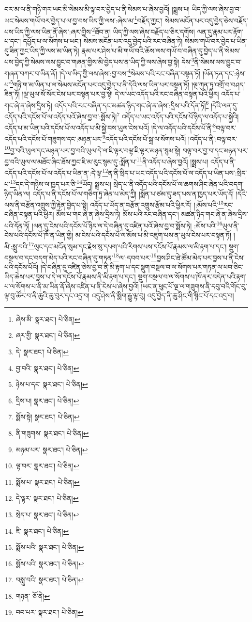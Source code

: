 བར་མ་ལ་ནི་གཉི་གར་ཡང་མི་སེམས་མི་ལྟ་བར་བྱེད་པ་ནི་སེམས་པ་ཞེས་བྱའོ། །སྨྲས་པ། ཡིད་ཀྱི་ལས་ཞེས་བྱ་བ་ཡང་སེམས་གཡོ་བར་བྱེད་པ་ལ་བྱ་བས་ཡིད་ཀྱི་ལས་:ཞེས་མ་\footnote{ཞེས་མི་  སྣར་ཐང་།  པེ་ཅིན། }བརྗོད་ཀྱང་། སེམས་མངོན་པར་འདུ་བྱེད་ཅེས་བརྗོད་པས་ཡིད་ཀྱི་ལས་ཡིན་ནོ་ཞེས་:ཞར་གྱིས་\footnote{ཞར་གྱི་  སྣར་ཐང་།  པེ་ཅིན། }ཐོབ་ན། ཡིད་ཀྱི་ལས་ཞེས་བརྗོད་པ་ཅིར་དགོས། ལན་དུ་རྣམ་པར་རྟོག་པ་དང་། དཔྱོད་པ་ལ་སོགས་པ་ཡང་། སེམས་མངོན་པར་འདུ་བྱེད་པའི་རང་བཞིན་ཏེ། སེམས་གཡོ་བར་བྱེད་པ་ཡིན་དུ་ཟིན་ཀྱང་ཡིད་ཀྱི་ལས་མ་ཡིན་ཏེ། རྣམ་པར་ཤེས་པ་མི་གཡོ་བའི་ཆོས་ལས་གཡོ་བ་བཞིན་དུ་བྱེད་པ་ནི་སེམས་པས་བྱེད་ཀྱི་སེམས་ལས་བྱུང་བ་གཞན་གྱིས་མི་བྱེད་པས་ན་ཡིད་ཀྱི་ལས་ཞེས་བྱ་སྟེ། དེས་\footnote{དེ་  སྣར་ཐང་།  པེ་ཅིན། }ནི་སེམས་ལས་བྱུང་བ་གཞན་བཀར་བ་ཡིན་ནོ། །དེ་ལ་ཡིད་ཀྱི་ལས་ཞེས་:བྱ་བས་\footnote{བྱ་བའི་  སྣར་ཐང་།  པེ་ཅིན། }སེམས་པའི་རང་བཞིན་བསྟན་ཏོ། །ཡོན་ཏན་དང་:ཉེས་པ་\footnote{ཉེས་པ་དང་  སྣར་ཐང་།  པེ་ཅིན། }གཉི་ག་མ་ཡིན་པ་ལ་སེམས་མངོན་པར་འདུ་བྱེད་པ་ནི་དེའི་ལས་ཡིན་པར་བསྟན་ཏོ། །ལྔ་ཀུན་ཏུ་འགྲོ་བ་བཤད་ཟིན་ཏོ། །ལྔ་ཡུལ་སོ་སོར་ངེས་པར་བསྟན་པར་བྱ་སྟེ། དེ་ལ་ཡང་འདོད་པའི་རང་བཞིན་བསྟན་པའི་ཕྱིར། འདོད་པ་གང་ཞེ་ན་ཞེས་དྲིས་ཏེ། འདོད་པའི་རང་བཞིན་དང་མཚན་ཉིད་གང་ཞེ་ན་ཞེས་:དྲིས་པའི་དོན་ཏོ།\footnote{དྲིས་པ།  སྣར་ཐང་།  པེ་ཅིན། } །དེའི་ལན་དུ་འདོད་པའི་དངོས་པོ་ལ་འདོད་པའོ་ཞེས་བྱ་བ་:སྨོས་ཏེ།\footnote{སྨོས་སྟེ།  སྣར་ཐང་།  པེ་ཅིན། } འདོད་པ་ཡང་འདོད་པའི་དངོས་པོ་ཉིད་ལ་འདོད་པ་སྐྱེའི། འདོད་པ་མ་ཡིན་པའི་དངོས་པོ་ལ་འདོད་པ་མི་སྐྱེ་བས་ཡུལ་ངེས་པའོ། །དེ་ལ་འདོད་པའི་དངོས་པོ་ནི་\footnote{ནི་གཟུགས་  སྣར་ཐང་།  པེ་ཅིན། }བལྟ་བར་འདོད་པའི་དངོས་པོ་གཟུགས་དང་:མཉན་པར་\footnote{མཉམ་པར་  སྣར་ཐང་།  པེ་ཅིན། }འདོད་པའི་དངོས་པོ་སྒྲ་ལ་སོགས་པའོ། །འདོད་པ་ནི་:བལྟ་བར་\footnote{ལྟ་བར་  སྣར་ཐང་།  པེ་ཅིན། }བྱ་བའི་ཡུལ་དང་མཉན་པར་བྱ་བའི་ཡུལ་དེ་ལ་ཇི་ལྟར་བལྟ་ཇི་ལྟར་མཉན་སྙམ་སྟེ། བལྟ་བར་བྱ་བ་དང་མཉན་པར་བྱ་བའི་ཡུལ་ལ་མཐོང་ཞིང་ཐོས་ཀྱང་ཇི་མ་རུང་སྙམ་དུ་:སྨོན་པ་\footnote{སྨོས་པ་  སྣར་ཐང་།  པེ་ཅིན། }ནི་འདོད་པ་ཞེས་བྱའོ། །སྨྲས་པ། འདོད་པ་ནི་འདོད་པའི་དངོས་པོ་ལ་འདོད་པ་ཡིན་ན་:དེ་ལྟ་\footnote{དེ་ལྟར་  སྣར་ཐང་།  པེ་ཅིན། }ན་ནི་སྲིད་པ་ཡང་འདོད་པའི་དངོས་པོ་ལ་འདོད་པ་ཡིན་པས་:སྲིད་པ་\footnote{སྲེད་པ་  སྣར་ཐང་།  པེ་ཅིན། }དང་དེ་གཉིས་ལ་ཁྱད་པར་ཅི་\footnote{ཇི་  སྣར་ཐང་།  པེ་ཅིན། }ཡོད། སྨྲས་པ། སྲེད་པ་ནི་འདོད་པའི་དངོས་པོ་ལ་ཆགས་ཤིང་ཞེན་པའི་བདག་ཉིད་ཡིན་ལ། འདོད་པ་ནི་དངོས་པོ་ལ་གཅིག་ཏུ་ཞེན་པ་མེད་ཀྱི། །སྨོན་པ་ཙམ་དུ་ཟད་པས་ན་ཁྱད་པར་ཡོད་དོ། །དེའི་ལས་ནི་བརྩོན་འགྲུས་ཀྱི་རྟེན་བྱེད་པ་སྟེ། འདོད་པ་ཡོད་ན་བརྩོན་འགྲུས་རྩོམ་པའི་ཕྱིར་རོ། །:མོས་པའི་\footnote{སྨོས་པའི་  སྣར་ཐང་།  པེ་ཅིན། }རང་བཞིན་བསྟན་པའི་ཕྱིར། མོས་པ་གང་ཞེ་ན་ཞེས་དྲིས་ཏེ། མོས་པའི་རང་བཞིན་དང་། མཚན་ཉིད་གང་ཞེ་ན་ཞེས་དྲིས་པའི་དོན་ཏོ། །ལན་དུ་ངེས་པའི་དངོས་པོ་ཉིད་ལ་དེ་བཞིན་དུ་འཛིན་པའོ་ཞེས་བྱ་བ་སྨོས་ཏེ། :མོས་པའི་\footnote{སྨོས་པའི་  སྣར་ཐང་།  པེ་ཅིན། }ཡུལ་ནི་ངེས་པའི་དངོས་པོ་ཁོ་ན་ཡིན་གྱི། མ་ངེས་པའི་དངོས་པོ་ལ་མོས་པ་མི་འཇུག་པས་ན་ཡུལ་ངེས་པར་བསྟན་ཏོ། །མི་:སླུ་བའི་\footnote{བསླུ་བའི་  སྣར་ཐང་།  པེ་ཅིན། }ལུང་དང་མངོན་སུམ་དང་རྗེས་སུ་དཔག་པའི་རིགས་པས་དངོས་པོ་རྣམས་ལ་མི་རྟག་པ་དང་། སྡུག་བསྔལ་བ་དང་བདག་མེད་པའི་རང་བཞིན་དུ་གཏན་\footnote{གཉན་  ཅོ་ནེ། }ལ་:དབབ་པར་\footnote{བབ་པར་  སྣར་ཐང་།  པེ་ཅིན། }བྱས་ཤིང་ཐེ་ཚོམ་མེད་པར་བྱས་པ་ནི་ངེས་པའི་དངོས་པོའོ། །དེ་བཞིན་དུ་འཛིན་ཅེས་བྱ་བ་ནི་མི་རྟག་པ་དང་སྡུག་བསྔལ་བ་ལ་སོགས་པར་གཏན་ལ་ཕབ་ཅིང་ཡིད་ཆེས་པར་བྱས་པ་དེ་ལ་དངོས་པོ་རྣམས་ནི་མི་རྟག་པ་དང་། སྡུག་བསྔལ་བ་ལ་སོགས་པ་ཁོ་ནར་བདེན་པའི་རྟག་པ་ལ་སོགས་པ་ནི་མ་ཡིན་ནོ་ཞེས་འཛིན་པ་ནི་ངེས་པ་ཞེས་བྱའོ། །ཡང་ན་ཕུང་པོ་ལྔ་ལ་གཟུགས་ནི་དབུ་བའི་གོང་བུ་ལྟ་བུ་ཚོར་བ་ནི་ཆུའི་ཆུ་བུར་དང་འདྲ་བ། འདུ་ཤེས་ནི་སྨིག་རྒྱུ་ལྟ་བུ། འདུ་བྱེད་ནི་ཆུ་ཤིང་གི་སྙིང་པོ་དང་འདྲ་བ། 